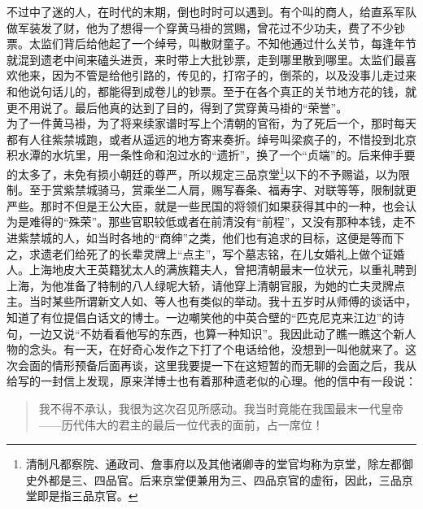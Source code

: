 不过中了迷的人，在时代的末期，倒也时时可以遇到。有个叫的商人，给直系军队做军装发了财，他为了想得一个穿黄马褂的赏赐，曾花过不少功夫，费了不少钞票。太监们背后给他起了一个绰号，叫散财童子。不知他通过什么关节，每逢年节就混到遗老中间来磕头进贡，来时带上大批钞票，走到哪里散到哪里。太监们最喜欢他来，因为不管是给他引路的，传见的，打帘子的，倒茶的，以及没事儿走过来和他说句话儿的，都能得到成卷儿的钞票。至于在各个真正的关节地方花的钱，就更不用说了。最后他真的达到了目的，得到了赏穿黄马褂的“荣誉”。\\

为了一件黄马褂，为了将来续家谱时写上个清朝的官衔，为了死后一个，那时每天都有人往紫禁城跑，或者从遥远的地方寄来奏折。绰号叫梁疯子的，不惜投到北京积水潭的水坑里，用一条性命和泡过水的“遗折”，换了一个“贞端”的。后来伸手要的太多了，未免有损小朝廷的尊严，所以规定三品京堂\footnote{清制凡都察院、通政司、詹事府以及其他诸卿寺的堂官均称为京堂，除左都御史外都是三、四品官。后来京堂便兼用为三、四品京官的虚衔，因此，三品京堂即是指三品京官。}以下的不予赐谥，以为限制。至于赏紫禁城骑马，赏乘坐二人肩，赐写春条、福寿字、对联等等，限制就更严些。那时不但是王公大臣，就是一些民国的将领们如果获得其中的一种，也会认为是难得的“殊荣”。那些官职较低或者在前清没有“前程”，又没有那种本钱，走不进紫禁城的人，如当时各地的“商绅”之类，他们也有追求的目标，这便是等而下之，求遗老们给死了的长辈灵牌上“点主”，写个墓志铭，在儿女婚礼上做个证婚人。上海地皮大王英籍犹太人的满族籍夫人，曾把清朝最末一位状元，以重礼聘到上海，为他准备了特制的八人绿呢大轿，请他穿上清朝官服，为她的亡夫灵牌点主。当时某些所谓新文人如、等人也有类似的举动。我十五岁时从师傅的谈话中，知道了有位提倡白话文的博士。一边嘲笑他的中英合壁的“匹克尼克来江边”的诗句，一边又说“不妨看看他写的东西，也算一种知识”。我因此动了瞧一瞧这个新人物的念头。有一天，在好奇心发作之下打了个电话给他，没想到一叫他就来了。这次会面的情形预备后面再谈，这里我要提一下在这短暂的而无聊的会面之后，我从给写的一封信上发现，原来洋博士也有着那种遗老似的心理。他的信中有一段说：\\

\begin{quote}
	我不得不承认，我很为这次召见所感动。我当时竟能在我国最末一代皇帝——历代伟大的君主的最后一位代表的面前，占一席位！\\
\end{quote}

